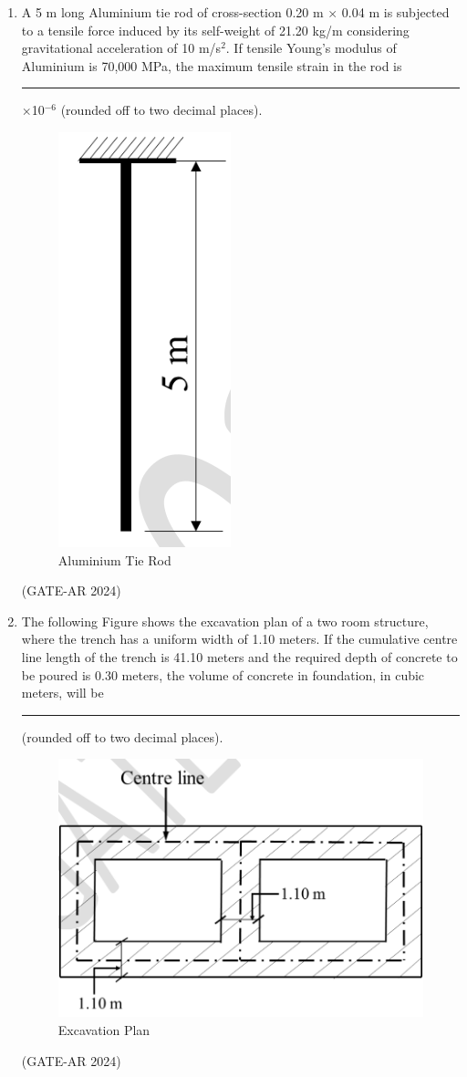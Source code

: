 \documentclass[a4paper,10pt]{article}
\begin{document}
\begin{enumerate}
\newpage

    \item A 5 m long Aluminium tie rod of cross-section 0.20 m $\times$ 0.04 m is subjected to a tensile force induced by its self-weight of 21.20 kg/m considering gravitational acceleration of 10 m/s$^2$. If tensile Young's modulus of Aluminium is 70,000 MPa, the maximum tensile strain in the rod is \rule{2cm}{0.4pt}$\times$10$^{-6}$ (rounded off to two decimal places). \\
    \begin{figure}[h!]
    \centering
    \includegraphics[width=0.2\columnwidth]{figs/15.jpg}
    \caption{Aluminium Tie Rod}
    \label{fig:Img15}
    \end{figure}
    \hfill (GATE-AR 2024)

    \item The following Figure shows the excavation plan of a two room structure, where the trench has a uniform width of 1.10 meters. If the cumulative centre line length of the trench is 41.10 meters and the required depth of concrete to be poured is 0.30 meters, the volume of concrete in foundation, in cubic meters, will be \rule{2cm}{0.4pt} (rounded off to two decimal places). \\
    \begin{figure}[h!]
    \centering
    \includegraphics[width=0.5\columnwidth]{figs/16.jpg}
    \caption{Excavation Plan}
    \label{fig:Img16}
    \end{figure}
    \hfill (GATE-AR 2024)


\end{enumerate}
\end{document}

